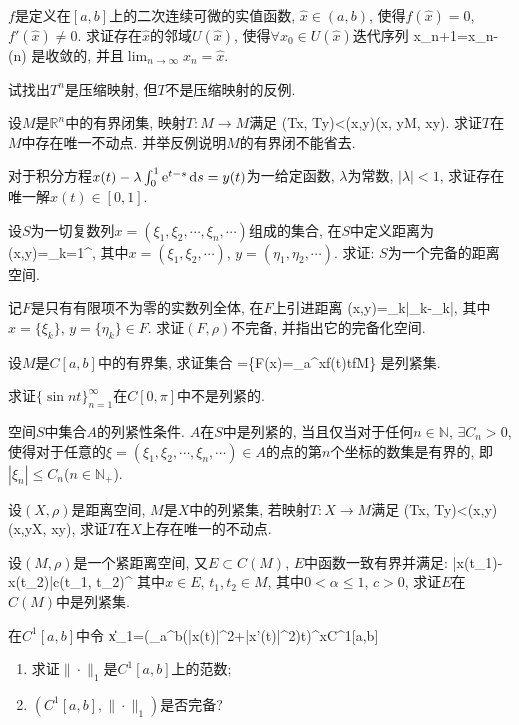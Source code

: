 \newpage
{}
$f$是定义在$[a,b]$上的二次连续可微的实值函数, $\hat{x}\in(a,b)$, 使得$f(\hat{x})=0$, $f'(\hat{x})\ne0$. 
求证存在$\hat{x}$的邻域$U(\hat{x})$, 使得$\forall x_0\in U(\hat{x})$迭代序列
\bee
x_{n+1}=x_{n}-\quad (n\in{})
\eee
是收敛的, 并且$\lim_{n\to\infty}x_{n}=\hat{x}$.
\eq

\newpage
\bq{}{}
试找出$T^n$是压缩映射, 但$T$不是压缩映射的反例.
\eq

\newpage
\bq{}{}
设$M$是$\mathbb{R}^n$中的有界闭集, 映射$T:M\to M$满足
\bee
\rho(Tx, Ty)<\rho(x,y)\quad (\forall x, y\in M, x\ne y).
\eee
求证$T$在$M$中存在唯一不动点. 并举反例说明$M$的有界闭不能省去.
\eq

\newpage
\bq{}{}
对于积分方程$x(t)-\lambda\int_0^1\mathrm{e}^{t-s}\,\mathrm{d} s=y(t)$为一给定函数, $\lambda$为常数, $|\lambda|<1$, 求证存在唯一解$x(t)\in[0,1]$.
\eq

\newpage
\bq{}{}
设$S$为一切复数列$x=(\xi_1,\xi_2, \cdots, \xi_n,\cdots)$组成的集合, 在$S$中定义距离为
\bee
\rho(x,y)=\sum_{k=1}^{\infty},
\eee
其中$x=(\xi_1, \xi_2, \cdots)$, $y=(\eta_1, \eta_2,\cdots)$. 求证: $S$为一个完备的距离空间.
\eq

\newpage
\bq{}{}
记$F$是只有有限项不为零的实数列全体, 在$F$上引进距离
\bee
\rho(x,y)=\sup_{k}|\xi_k-\eta_k|,
\eee
其中$x=\{\xi_k\}$, $y=\{\eta_k\}\in F$. 求证$(F, \rho)$不完备, 并指出它的完备化空间.
\eq

\newpage
\bq{}{}
设$M$是$C[a,b]$中的有界集, 求证集合
\bee
{}=\left\{F(x)=\int_a^xf(t)\ud t\vert f\in M\right\}
\eee
是列紧集.
\eq

\newpage
\bq{}{}
求证$\{\sin nt\}_{n=1}^{\infty}$在$C[0,\pi]$中不是列紧的.
\eq

\newpage
\bq{}{}
空间$S$中集合$A$的列紧性条件. $A$在$S$中是列紧的, 当且仅当对于任何$n\in\mathbb{N}$, $\exists C_n>0$, 
使得对于任意的$\xi=(\xi_1, \xi_2, \cdots, \xi_n, \cdots)\in A$的点的第$n$个坐标的数集是有界的, 即$|\xi_n|\le C_n$($n\in\mathbb{N}_{+}$).
\eq

\newpage
\bq{}{}
设$(X, \rho)$是距离空间, $M$是$X$中的列紧集, 若映射$T:X\to M$满足
\bee
\rho(Tx, Ty)<\rho(x,y)\quad (\forall x,y\in X, x\ne y),
\eee
求证$T$在$X$上存在唯一的不动点. 
\eq

\newpage
\bq{}{}
设$(M,\rho)$是一个紧距离空间, 又$E\subset C(M)$, $E$中函数一致有界并满足:
\bee
|x(t_1)-x(t_2)|\le c\rho(t_1, t_2)^{\alpha}
\eee
其中$x\in E$, $t_1, t_2\in M$, 其中$0<\alpha\le 1$, $c>0$, 求证$E$在$C(M)$中是列紧集.
\eq

\newpage
\bq{}{}
在$C^1[a,b]$中令
\bee
\|x\|_1=\left(\int_a^b(|x(t)|^2+|x'(t)|^2)\ud t\right)^\quad \forall x\in C^1[a,b]
\eee
\begin{enumerate}[(1)]
 \item 求证$\|\cdot\|_1$是$C^1[a,b]$上的范数;
 \item $(C^1[a,b], \|\cdot\|_1)$是否完备?
\end{enumerate}
\eq